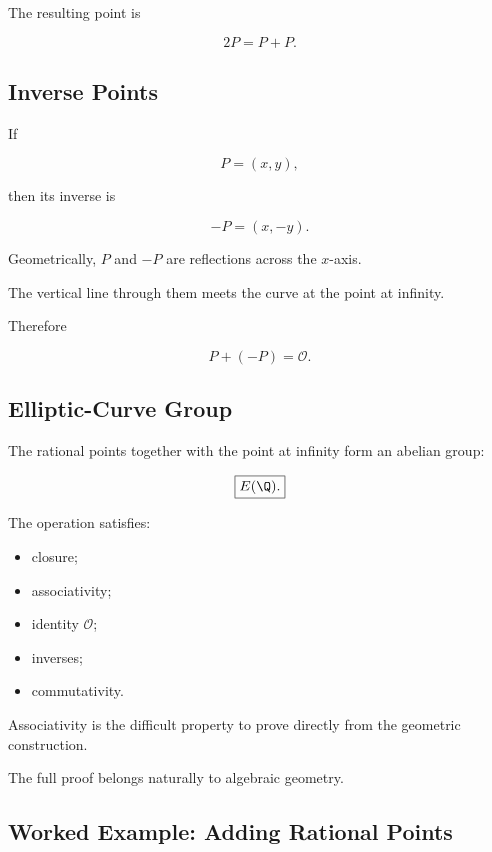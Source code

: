 The resulting point is

\[ 2P=P+P. \]

\subsection{Inverse Points}
\label{subsec:elliptic-inverse-points}

If

\[ P=(x,y), \]

then its inverse is

\[ \boxed{-P=(x,-y).} \]

Geometrically, \(P\) and \(-P\) are reflections across the \(x\)-axis.

The vertical line through them meets the curve at the point at infinity.

Therefore

\[ \boxed{P+(-P)=\mathcal O.} \]

\subsection{Elliptic-Curve Group}
\label{subsec:elliptic-curve-group}

The rational points together with the point at infinity form an abelian
group:

\[ \boxed{E(\Q).} \]

The operation satisfies:

\begin{itemize}
    \item closure;
    \item associativity;
    \item identity \(\mathcal O\);
    \item inverses;
    \item commutativity.
\end{itemize}

Associativity is the difficult property to prove directly from the geometric
construction.

The full proof belongs naturally to algebraic geometry.

\subsection{Worked Example: Adding Rational Points}
\label{subsec:worked-elliptic-addition}

